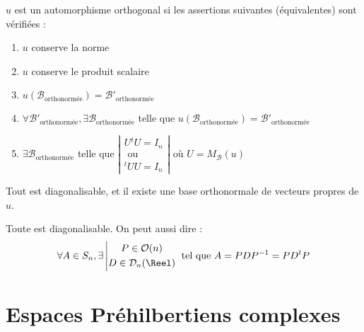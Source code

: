 \documentclass[11pt,a4paper,fleqn,pdftex]{report}
\begin{document}
\begin{theorem}
    $u$ est un automorphisme orthogonal si les assertions suivantes (équivalentes) sont vérifiées :
    \renewcommand{\theenumi}{\roman{enumi}}%
    \begin{enumerate}
        \item $u$ conserve la norme
        \item $u$ conserve le produit scalaire
        \item $u\left(\mathcal{B}_\text{orthonormée}\right) = \mathcal{B}'_\text{orthonormée}$
        \item $\forall \mathcal{B'}_\text{orthonormée}, \exists \mathcal{B}_\text{orthonormée}$ telle que $u\left(\mathcal{B}_\text{orthonormée}\right) = \mathcal{B}'_\text{orthonormée}$
        \item $\exists \mathcal{B}_\text{orthonormée} $ telle que $\left| \begin{gathered}
            U{}^tU = I_n\\
            \text{ ou }\\
            {}^tUU = I_n
        \end{gathered}\right|$ où $U = M_\mathcal{B}(u)$
    \end{enumerate}
\end{theorem}

\begin{itheorem}
    Tout  est diagonalisable, et il existe une base orthonormale de vecteurs propres de $u$.\par

    Toute  est diagonalisable. On peut aussi dire : 
    \begin{equation}
    \forall A \in S_n, \exists  \left| \begin{gathered} P \in \mathcal{O}(n) \\ D \in \mathcal{D}_n(\Reel) \end{gathered} \right. \text{ tel que } A = PDP^{-1} = PD{}^tP
    \end{equation}
\end{itheorem}
\chapter{Espaces Préhilbertiens complexes}
\end{document}
